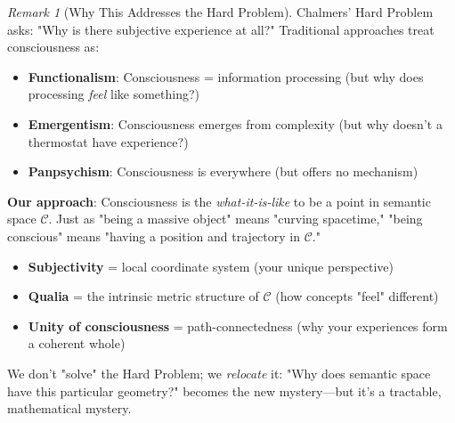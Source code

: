 \documentclass[11pt,a4paper]{article}
\theoremstyle{definition}
\theoremstyle{remark}
\newtheorem{remark}{Remark}[section]
\newcommand{\CC}{\mathcal{C}}
\newcommand{\cc}{\mathbf{c}}
\begin{document}
\begin{small}
\begin{remark}[Why This Addresses the Hard Problem]
Chalmers' Hard Problem asks: "Why is there subjective experience at all?" Traditional approaches treat consciousness as:
\begin{itemize}
    \item \textbf{Functionalism}: Consciousness = information processing (but why does processing \textit{feel} like something?)
    \item \textbf{Emergentism}: Consciousness emerges from complexity (but why doesn't a thermostat have experience?)
    \item \textbf{Panpsychism}: Consciousness is everywhere (but offers no mechanism)
\end{itemize}

\textbf{Our approach}: Consciousness is the \textit{what-it-is-like} to be a point in semantic space \(\CC\). Just as "being a massive object" means "curving spacetime," "being conscious" means "having a position and trajectory in \(\CC\)."

\begin{itemize}
    \item \textbf{Subjectivity} = local coordinate system (your unique perspective)
    \item \textbf{Qualia} = the intrinsic metric structure of \(\CC\) (how concepts "feel" different)
    \item \textbf{Unity of consciousness} = path-connectedness (why your experiences form a coherent whole)
\end{itemize}

We don't "solve" the Hard Problem; we \textit{relocate} it: "Why does semantic space have this particular geometry?" becomes the new mystery—but it's a tractable, mathematical mystery.
\end{remark}

\begin{figure}[H]
\centering
{}
\end{figure}
\end{small}
\end{document}
